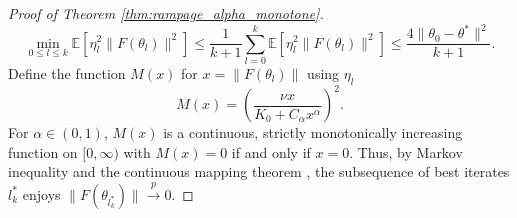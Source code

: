 \documentclass[letter,11pt]{article}
\begin{document}
\begin{proof}[Proof of Theorem \ref{thm:rampage_alpha_monotone}]
\begin{equation}
\min_{0 \le l \le k} \mathbb{E}\left[ \eta_l^2 \|F(\theta_l)\|^2 \right] \le \frac{1}{k+1} \sum_{l=0}^k \mathbb{E}\left[ \eta_l^2 \|F(\theta_l)\|^2 \right] \le \frac{4\|\theta_0 - \theta^*\|^2}{k+1}.
\end{equation}
Define the function $M(x)$ for $x = \|F(\theta_l)\|$ using $\eta_l$
\begin{equation}
M(x) = \left( \frac{\nu x}{K_0 + C_\alpha x^\alpha} \right)^2.
\end{equation}
For $\alpha \in (0, 1)$, $M(x)$ is a continuous, strictly monotonically increasing function on $[0, \infty)$ with $M(x) = 0$ if and only if $x = 0$. Thus,  by Markov inequality and the continuous mapping theorem \cite{mann1943stochastic}, the subsequence of best iterates $l^\ast_k$ enjoys $\|F(\theta_{l^\ast_k})\| \xrightarrow{p} 0$.
\end{proof}
\end{document}

